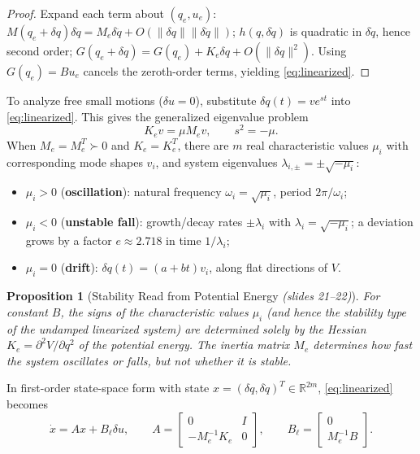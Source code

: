 \documentclass[11pt, a4paper]{article}
\theoremstyle{definition}
\theoremstyle{plain}
\newtheorem{proposition}[definition]{Proposition}
\begin{document}
\begin{proof}
Expand each term about $(q_e, u_e)$: $M(q_e + \delta q)\delta\ddot{q} = M_e \delta\ddot{q} + O(\|\delta q\|\|\delta\ddot{q}\|)$; $h(q, \delta\dot{q})$ is quadratic in $\delta\dot{q}$, hence second order; $G(q_e + \delta q) = G(q_e) + K_e \delta q + O(\|\delta q\|^2)$. Using $G(q_e) = B u_e$ cancels the zeroth-order terms, yielding \eqref{eq:linearized}.
\end{proof}

To analyze free small motions ($\delta u = 0$), substitute $\delta q(t) = v e^{st}$ into \eqref{eq:linearized}. This gives the generalized eigenvalue problem
\[
  K_e v = \mu M_e v, \qquad s^2 = -\mu.
\]
When $M_e = M_e^T \succ 0$ and $K_e = K_e^T$, there are $m$ real characteristic values $\mu_i$ with corresponding mode shapes $v_i$, and system eigenvalues $\lambda_{i,\pm} = \pm\sqrt{-\mu_i}$:
\begin{itemize}
  \item $\mu_i > 0$ (\textbf{oscillation}): natural frequency $\omega_i = \sqrt{\mu_i}$, period $2\pi / \omega_i$;
  \item $\mu_i < 0$ (\textbf{unstable fall}): growth/decay rates $\pm\lambda_i$ with $\lambda_i = \sqrt{-\mu_i}$; a deviation grows by a factor $e \approx 2.718$ in time $1/\lambda_i$;
  \item $\mu_i = 0$ (\textbf{drift}): $\delta q(t) = (a + bt) v_i$, along flat directions of $V$.
\end{itemize}

\begin{proposition}[Stability Read from Potential Energy \emph{(slides 21--22)}]
For constant $B$, the signs of the characteristic values $\mu_i$ (and hence the stability type of the undamped linearized system) are determined solely by the Hessian $K_e = \partial^2 V / \partial q^2$ of the potential energy. The inertia matrix $M_e$ determines \emph{how fast} the system oscillates or falls, but not whether it is stable.
\end{proposition}

In first-order state-space form with state $x = (\delta q, \delta\dot{q})^T \in \mathbb{R}^{2m}$, \eqref{eq:linearized} becomes
\[
  \dot{x} = A x + B_\ell \delta u, \qquad
  A = \begin{bmatrix} 0 & I \\ -M_e^{-1} K_e & 0 \end{bmatrix}, \qquad
  B_\ell = \begin{bmatrix} 0 \\ M_e^{-1} B \end{bmatrix}.
\]
\end{document}
